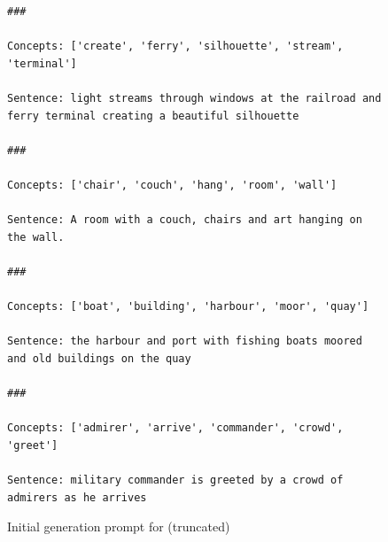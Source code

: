 \begin{figure}

\begin{small}
    \captionsetup{justification=centering, labelfont=bf, font=small}
    \begin{verbatim}
###

Concepts: ['create', 'ferry', 'silhouette', 'stream', 'terminal']

Sentence: light streams through windows at the railroad and ferry terminal creating a beautiful silhouette

###

Concepts: ['chair', 'couch', 'hang', 'room', 'wall']

Sentence: A room with a couch, chairs and art hanging on the wall.

###

Concepts: ['boat', 'building', 'harbour', 'moor', 'quay']

Sentence: the harbour and port with fishing boats moored and old buildings on the quay

###

Concepts: ['admirer', 'arrive', 'commander', 'crowd', 'greet']

Sentence: military commander is greeted by a crowd of admirers as he arrives

\end{verbatim}

\end{small}
\caption{Initial generation prompt for \commongen (truncated)}
    \label{fig:prompt:commongen:init}
\end{figure}